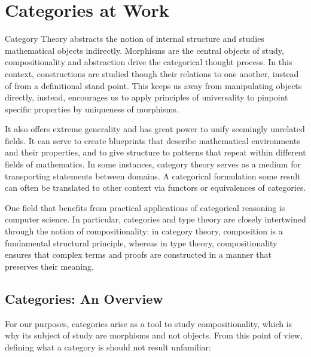 \chapter{Categories at Work}

Category Theory abstracts the notion of internal structure and studies mathematical objects indirectly. Morphisms are the central objects of study, compositionality and abstraction drive the categorical thought process. In this context, constructions are studied though their relations to one another, instead of from a definitional stand point. This keeps us away from manipulating objects directly, instead, encourages us to apply principles of universality to pinpoint specific properties by uniqueness of morphisms.

It also offers extreme generality and has great power to unify seemingly unrelated fields. It can serve to create blueprints that describe mathematical environments and their properties, and to give structure to patterns that repeat within different fields of mathematics. In some instances, category theory serves as a medium for transporting statements between domains. A categorical formulation some result can often be translated to other context via functors or equivalences of categories.

One field that benefits from practical applications of categorical reasoning is computer science. In particular, categories and type theory are closely intertwined through the notion of compositionality: in category theory, composition is a fundamental structural principle, whereas in type theory, compositionality ensures that complex terms and proofs are constructed in a manner that preserves their meaning.

\section{\centering Categories: An Overview}

For our purposes, categories arise as a tool to study compositionality, which is why its subject of study are morphisms and not objects. From this point of view, defining what a category is should not result unfamiliar:

